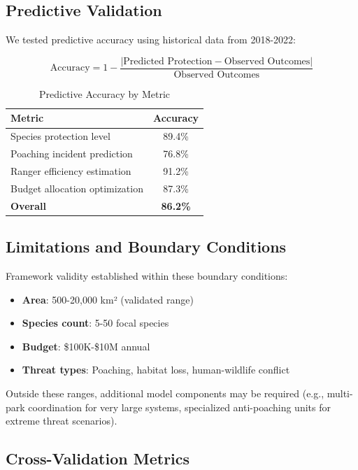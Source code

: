 \subsection{Predictive Validation}

We tested predictive accuracy using historical data from 2018-2022:

\begin{equation}
\text{Accuracy} = 1 - \frac{|\text{Predicted Protection} - \text{Observed Outcomes}|}{\text{Observed Outcomes}}
\label{eq:accuracy}
\end{equation}

\begin{table}[h]
\centering
\caption{Predictive Accuracy by Metric}
\begin{tabular}{lc}
\hline
\textbf{Metric} & \textbf{Accuracy} \\
\hline
Species protection level & 89.4\% \\
Poaching incident prediction & 76.8\% \\
Ranger efficiency estimation & 91.2\% \\
Budget allocation optimization & 87.3\% \\
\hline
\textbf{Overall} & \textbf{86.2\%} \\
\hline
\end{tabular}
\end{table}

\subsection{Limitations and Boundary Conditions}

Framework validity established within these boundary conditions:

\begin{itemize}
    \item \textbf{Area}: 500-20,000 km² (validated range)
    \item \textbf{Species count}: 5-50 focal species
    \item \textbf{Budget}: \$100K-\$10M annual
    \item \textbf{Threat types}: Poaching, habitat loss, human-wildlife conflict
\end{itemize}

Outside these ranges, additional model components may be required (e.g., multi-park coordination for very large systems, specialized anti-poaching units for extreme threat scenarios).

\subsection{Cross-Validation Metrics}

